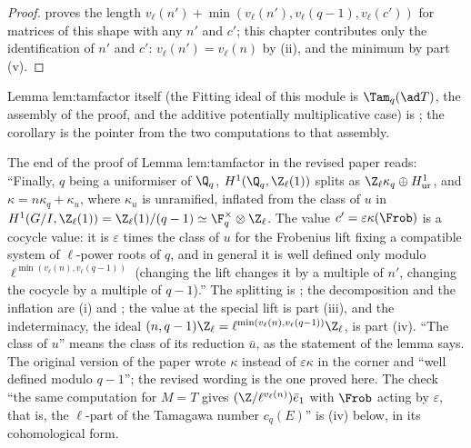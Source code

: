 \begin{proof}
 proves the length $v_\ell(n')+\min(v_\ell(n'),v_\ell(q-1),v_\ell(c'))$ for matrices of this shape with any $n'$ and $c'$; this chapter contributes only the
identification of $n'$ and $c'$: $v_\ell(n')=v_\ell(n)$ by (ii), and the minimum by part (v).
\end{proof}

\noindent Lemma lem:tamfactor itself (the Fitting ideal of this module is $\Tam_q(\ad T)$, the assembly of the proof, and the additive potentially multiplicative case) is
; the corollary is the pointer from the two computations to that assembly.

\begin{paperlink}\label{pl:galcoh:tamfactor}
The end of the proof of Lemma lem:tamfactor in the revised paper reads: ``Finally, $q$ being a uniformiser of $\Q_q$, $H^1(\Q_q,\Z_\ell(1))$ splits as
$\Z_\ell\kappa_q\oplus H^1_{\mathrm{ur}}$, and $\kappa=n\kappa_q+\kappa_u$, where $\kappa_u$ is unramified, inflated from the class of $u$ in
$H^1(G/I,\Z_\ell(1))=\Z_\ell(1)/(q-1)\simeq\F_q^\times\otimes\Z_\ell$. The value $c'=\varepsilon\kappa(\Frob)$ is a cocycle value: it is $\varepsilon$ times the class of $u$ for the
Frobenius lift fixing a compatible system of $\ell$-power roots of $q$, and in general it is well defined only modulo $\ell^{\min(v_\ell(n),v_\ell(q-1))}$ (changing the lift
changes it by a multiple of $n'$, changing the cocycle by a multiple of $q-1$).'' The splitting is ; the decomposition and the
inflation are (i) and ; the value at the special lift is part (iii), and the indeterminacy, the
ideal $(n,q-1)\Z_\ell=\ell^{\min(v_\ell(n),v_\ell(q-1))}\Z_\ell$, is part (iv). ``The class of $u$'' means the class of its reduction $\bar u$, as the statement of the lemma
says. The original version of the paper wrote $\kappa$ instead of $\varepsilon\kappa$ in the corner and ``well defined modulo $q-1$''; the revised wording is the one proved
here. The check ``the same computation for $M=T$ gives $(\Z/\ell^{v_\ell(n)})\bar e_1$ with $\Frob$ acting by $\varepsilon$, that is, the $\ell$-part of the Tamagawa number
$c_q(E)$'' is (iv) below, in its cohomological form.
\end{paperlink}

